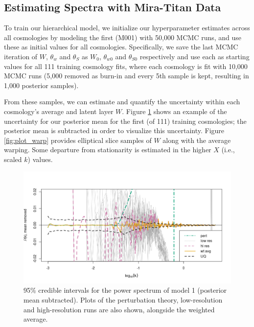 \documentclass[11pt]{article}
\begin{document}
\subsection{Estimating Spectra with Mira-Titan Data}
\label{subsec:mira_fit}

To train our hierarchical model, we initialize our hyperparameter estimates across 
all cosmologies by modeling the first (M001) with 50,000 MCMC runs, and use these 
as initial values for all cosmologies. Specifically, we save the last MCMC 
iteration of $W$, $\theta_w$ and $\theta_S$ as $W_0$, $\theta_{w0}$ and $\theta_{S0}$ 
respectively and use each as starting values for all 111 training cosmology fits, 
where each cosmology is fit with 10,000 MCMC runs (5,000 removed as burn-in and 
every 5th sample is kept, resulting in 1,000 posterior samples).

From these samples, we can estimate and quantify the uncertainty within each 
cosmology's average and latent layer $W$. Figure \ref{fig:plot_fit} shows an 
example of the uncertainty for our posterior mean for the first (of 111) training 
cosmologies; the posterior mean is subtracted in order to visualize this uncertainty. 
Figure \ref{fig:plot_warp} provides elliptical slice samples of $W$ along with the 
average warping. Some departure from stationarity is estimated in the higher $X$ 
(i.e., scaled $k$) values.

\begin{figure}[ht]
    \centering
    \includegraphics[width=6in]{plot_fit.png}
    \caption{95\% credible intervals for the power spectrum of model 1 (posterior mean 
             subtracted). Plots of the perturbation theory, low-resolution and high-resolution 
             runs are also shown, alongside the weighted average.}
    \label{fig:plot_fit}
\end{figure}
\end{document}
